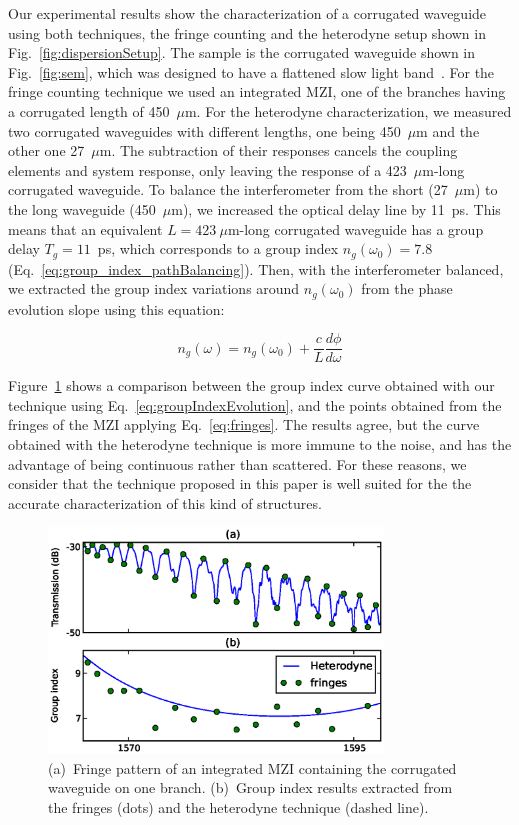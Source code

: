\documentclass[journal]{IEEEtran}
\begin{document}
Our experimental results show the characterization of a corrugated waveguide using both techniques, the fringe counting and the heterodyne setup shown in Fig.~\ref{fig:dispersionSetup}. The sample is the corrugated waveguide shown in Fig.~\ref{fig:sem}, which was designed to have a flattened slow light band~\cite{Brimont2010}. For the fringe counting technique we used an integrated MZI, one of the branches having a corrugated length of 450~$\mu$m. For the heterodyne characterization, we measured two corrugated waveguides with different lengths, one being 450~$\mu$m and the other one 27~$\mu$m. The subtraction of their responses cancels the coupling elements and system response, only leaving the response of a 423~$\mu$m-long corrugated waveguide.
To balance the interferometer from the short (27~$\mu$m) to the long waveguide (450~$\mu$m), we increased the optical delay line by 11~ps.
This means that an equivalent $L=423~\mu$m-long corrugated waveguide has a group delay $T_g=11$~ps, which corresponds to a group index $n_g(\omega_0)=7.8$ (Eq.~\ref{eq:group_index_pathBalancing}). Then, with the interferometer balanced, we extracted the group index variations around $n_g(\omega_0)$ from the phase evolution slope using this equation:

\begin{equation}
  n_g (\omega)=  n_g(\omega_0) + \frac{c}{L} \frac{d\phi}{d\omega}
 \label{eq:groupIndexEvolution}
\end{equation}

Figure~\ref{fig:groupIndex} shows a comparison between the group index curve obtained with our technique using Eq.~\ref{eq:groupIndexEvolution}, and the points obtained from the fringes of the MZI applying Eq.~\ref{eq:fringes}.
The results agree, but the curve obtained with the heterodyne technique is more immune to the noise, and has the advantage of being continuous rather than scattered.
For these reasons, we consider that the technique proposed in this paper is well suited for the the accurate characterization of this kind of structures.


\begin{figure}[htb]
  \centering
  \includegraphics[width=3.5in]{gropIndexComparison_2}
  \caption{(a)~Fringe pattern of an integrated MZI containing the corrugated waveguide on one branch. (b)~Group index results extracted from the fringes (dots) and the heterodyne technique (dashed line).}
  \label{fig:groupIndex}
\end{figure}
\end{document}
